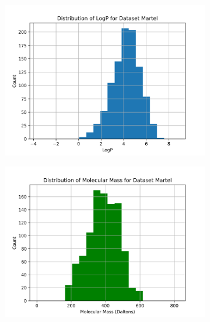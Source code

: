 \documentclass{article}
\theoremstyle{definition}
\theoremstyle{remark}
\begin{document}
\begin{figure}
\bigskip %
\begin{subfigure}[t]{0.45\textwidth}
    \includegraphics[width=\linewidth]{./../plots/logp_distribution_Martel.png}
\end{subfigure}\hspace{\fill} %
\begin{subfigure}[t]{0.45\textwidth}
    \includegraphics[width=\linewidth]{./../plots/molecular_mass_distribution_Martel.png}
\end{subfigure}


\end{figure}
\end{document}
